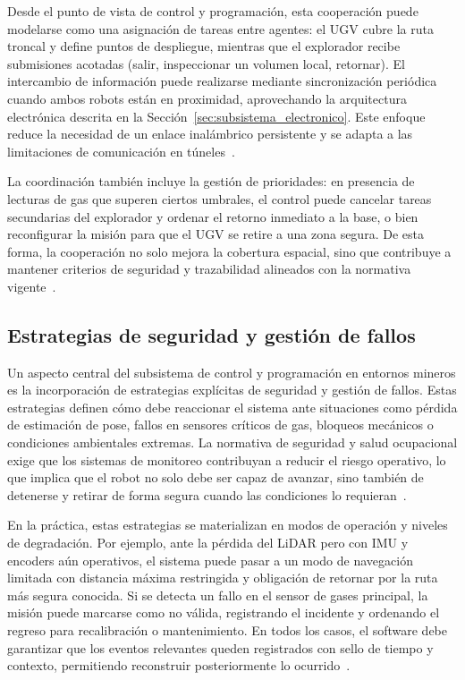 Desde el punto de vista de control y programación, esta cooperación puede modelarse como una asignación de tareas entre agentes: el UGV cubre la ruta troncal y define puntos de despliegue, mientras que el explorador recibe submisiones acotadas (salir, inspeccionar un volumen local, retornar). El intercambio de información puede realizarse mediante sincronización periódica cuando ambos robots están en proximidad, aprovechando la arquitectura electrónica descrita en la Sección~\ref{sec:subsistema_electronico}. Este enfoque reduce la necesidad de un enlace inalámbrico persistente y se adapta a las limitaciones de comunicación en túneles~\cite{OSINERGMIN_BoletinGSM_2020}.

La coordinación también incluye la gestión de prioridades: en presencia de lecturas de gas que superen ciertos umbrales, el control puede cancelar tareas secundarias del explorador y ordenar el retorno inmediato a la base, o bien reconfigurar la misión para que el UGV se retire a una zona segura. De esta forma, la cooperación no solo mejora la cobertura espacial, sino que contribuye a mantener criterios de seguridad y trazabilidad alineados con la normativa vigente~\cite{MINEM_DS024_2016,EU_ExposureDirective_2020}.

\subsection{Estrategias de seguridad y gestión de fallos}

\hspace{1.25cm}
Un aspecto central del subsistema de control y programación en entornos mineros es la incorporación de estrategias explícitas de seguridad y gestión de fallos. Estas estrategias definen cómo debe reaccionar el sistema ante situaciones como pérdida de estimación de pose, fallos en sensores críticos de gas, bloqueos mecánicos o condiciones ambientales extremas. La normativa de seguridad y salud ocupacional exige que los sistemas de monitoreo contribuyan a reducir el riesgo operativo, lo que implica que el robot no solo debe ser capaz de avanzar, sino también de detenerse y retirar de forma segura cuando las condiciones lo requieran~\cite{MINEM_DS024_2016,MINEM_Yanaquihua_2023}.

En la práctica, estas estrategias se materializan en modos de operación y niveles de degradación. Por ejemplo, ante la pérdida del LiDAR pero con IMU y encoders aún operativos, el sistema puede pasar a un modo de navegación limitada con distancia máxima restringida y obligación de retornar por la ruta más segura conocida. Si se detecta un fallo en el sensor de gases principal, la misión puede marcarse como no válida, registrando el incidente y ordenando el regreso para recalibración o mantenimiento. En todos los casos, el software debe garantizar que los eventos relevantes queden registrados con sello de tiempo y contexto, permitiendo reconstruir posteriormente lo ocurrido~\cite{OSINERGMIN_BoletinGSM_2020b,GEI_MinasPeru_2022}.


